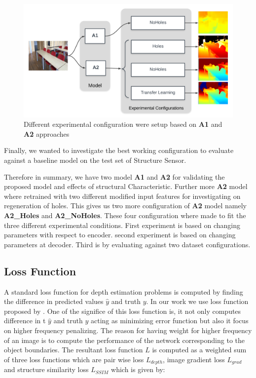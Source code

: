 \begin{figure}[h]
    \centering
    \includegraphics[width = 14cm]{Figures/config_setup.png}
    \caption{Different experimental configuration were setup based on \textbf{A1} and \textbf{A2} approaches}
    \label{fig:Experimental_Setup}
\end{figure}{}

Finally, we wanted to investigate the best working configuration to evaluate against a baseline model on the test set of Structure Sensor. 

Therefore in summary, we have two model \textbf{A1} and \textbf{A2} for validating the proposed model and effects of structural Characteristic. Further more \textbf{A2} model where retrained with two different modified input features for investigating on regeneration of holes. This gives us two more configuration of \textbf{A2} model namely \textbf{A2\_Holes} and \textbf{A2\_NoHoles}. These four configuration where made to fit the three different experimental conditions. First experiment is based on changing parameters with respect to encoder. second experiment is based on changing parameters at decoder. Third is by evaluating against two dataset configurations.

\subsection{Loss Function}
\label{Chapter5:LossFunction}
A standard loss function for depth estimation problems is computed by finding the difference in predicted values \(\hat{y}\) and truth \(y\). In our work we use loss function proposed by \cite{Alhashim2018}. One of the significe of this loss function is, it not only computes difference in t \(\hat{y}\) and truth \(y\) acting as minimizing error function but also it focus on higher frequency penalizing. The reason for having weight for higher frequency of an image is to compute the performance of the network corresponding to the object boundaries. The resultant loss function \(L\) is computed as a weighted sum of three loss functions which are pair wise loss \(L_{depth}\), image gradient loss \(L_{grad}\) and structure similarity loss  \(L_{SSIM}\) which is given by:


